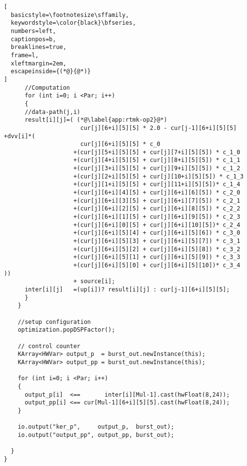 \begin{lstlisting}[
  basicstyle=\footnotesize\sffamily,
  keywordstyle=\color{black}\bfseries,
  numbers=left,
  captionpos=b,
  breaklines=true,
  frame=l,
  xleftmargin=2em,
  escapeinside={(*@}{@*)}
]
      //Computation
      for (int i=0; i <Par; i++)
      {
      //data-path(j,i)
      result[i][j]=( (*@\label{app:rtmk-op2}@*)
                      cur[j][6+i][5][5] * 2.0 - cur[j-1][6+i][5][5] +dvv[i]*(
                      cur[j][6+i][5][5] * c_0
                    +(cur[j][5+i][5][5] + cur[j][7+i][5][5]) * c_1_0
                    +(cur[j][4+i][5][5] + cur[j][8+i][5][5]) * c_1_1
                    +(cur[j][3+i][5][5] + cur[j][9+i][5][5]) * c_1_2
                    +(cur[j][2+i][5][5] + cur[j][10+i][5][5]) * c_1_3
                    +(cur[j][1+i][5][5] + cur[j][11+i][5][5])* c_1_4
                    +(cur[j][6+i][4][5] + cur[j][6+i][6][5]) * c_2_0
                    +(cur[j][6+i][3][5] + cur[j][6+i][7][5]) * c_2_1
                    +(cur[j][6+i][2][5] + cur[j][6+i][8][5]) * c_2_2
                    +(cur[j][6+i][1][5] + cur[j][6+i][9][5]) * c_2_3
                    +(cur[j][6+i][0][5] + cur[j][6+i][10][5])* c_2_4
                    +(cur[j][6+i][5][4] + cur[j][6+i][5][6]) * c_3_0
                    +(cur[j][6+i][5][3] + cur[j][6+i][5][7]) * c_3_1
                    +(cur[j][6+i][5][2] + cur[j][6+i][5][8]) * c_3_2
                    +(cur[j][6+i][5][1] + cur[j][6+i][5][9]) * c_3_3
                    +(cur[j][6+i][5][0] + cur[j][6+i][5][10])* c_3_4 ))
                    + source[i];
      inter[i][j]   =(up[i])? result[i][j] : cur[j-1][6+i][5][5];
      }
    }

    //setup configuration
    optimization.popDSPFactor();

    // control counter
    KArray<HWVar> output_p  = burst_out.newInstance(this);
    KArray<HWVar> output_pp = burst_out.newInstance(this);

    for (int i=0; i <Par; i++)
    {
      output_p[i]  <==       inter[i][Mul-1].cast(hwFloat(8,24));
      output_pp[i] <== cur[Mul-1][6+i][5][5].cast(hwFloat(8,24));
    }

    io.output("ker_p",     output_p,  burst_out);
    io.output("output_pp", output_pp, burst_out);

  }
}
\end{lstlisting}